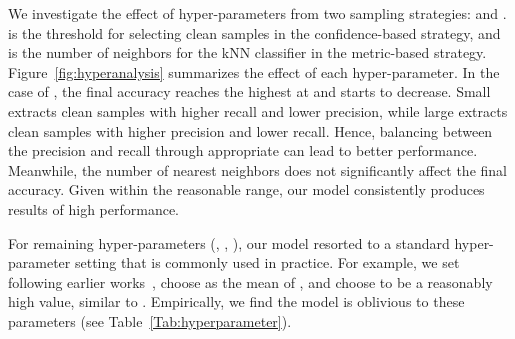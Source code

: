 \documentclass[final]{cvpr}
\begin{document}
We investigate the effect of hyper-parameters from two sampling strategies:  and .  is the threshold for selecting clean samples in the confidence-based strategy, and  is the number of neighbors for the kNN classifier in the metric-based strategy. Figure~\ref{fig:hyperanalysis} summarizes the effect of each hyper-parameter. In the case of , the final accuracy reaches the highest at  and starts to decrease. Small  extracts clean samples with higher recall and lower precision, while large  extracts clean samples with higher precision and lower recall. Hence, balancing between the precision and recall through appropriate  can lead to better performance. Meanwhile, the number of nearest neighbors  does not significantly affect the final accuracy. Given  within the reasonable range, our model consistently produces results of high performance. 

For remaining hyper-parameters (, , ), our model resorted to a standard hyper-parameter setting that is commonly used in practice. For example, we set  following earlier works~\cite{berthelot2019mixmatch,li2020dividemix}, choose  as the mean of , and choose  to be a reasonably high value, similar to . Empirically, we find the model is oblivious to these parameters (see Table~\ref{Tab:hyperparameter}).  

\begin{table}[!h]
\centering
    \begin{minipage}{1.5in}
    \end{minipage}
    \hspace{1mm}
    \begin{minipage}{1.5in}
    \end{minipage}
\caption{Hyper-parameter analyses (, , )}
\label{Tab:hyperparameter}
\end{table}
\end{document}
